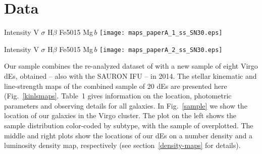 \documentclass[useAMS,usenatbib]{mn2e}
\newcounter{subfigure}
\newcommand{\hb}{H$\beta$}
\newcommand{\sig}{$\sigma$}
\newcommand{\mgb}{Mg\,$b$}
\begin{document}
\section[Data]{Data}
\label{label:data}

\begin{figure*}
\begin{leftfullpage}
\begin{center}
\hspace{0.3cm}Intensity \hspace{1.5cm} V \hspace{1.9cm} {\sig} \hspace{1.9cm} {\hb} \hspace{1.9cm} Fe5015 \hspace{1.5cm} {\mgb}
\texttt{[image: maps\_paperA\_1\_ss\_SN30.eps]}
\end{center}
\caption{Intensity, stellar velocity, velocity dispersion, \hb, Fe5015, and {\mgb} lines maps. The maps shown here comprise the re-analyzed sample of \protect\cite{rys:2013} together with the new data presented here for the first time.}
\label{kinlsmaps}
\end{leftfullpage}
\end{figure*}

\addtocounter{figure}{-1}
\addtocounter{subfigure}{1}


\begin{figure*}
\begin{fullpage}
\begin{center}
\hspace{0.3cm}Intensity \hspace{1.5cm} V \hspace{1.9cm} {\sig} \hspace{1.9cm} {\hb} \hspace{1.9cm} Fe5015 \hspace{1.5cm} {\mgb}
  \texttt{[image: maps\_paperA\_2\_ss\_SN30.eps]}
\end{center}
\end{fullpage}
\caption{Continued.}
\end{figure*}


Our sample combines the re-analyzed dataset of \cite{rys:2013} with a new sample of eight Virgo dEs, obtained -- also with the SAURON IFU -- in 2014. The stellar kinematic and line-strength maps of the combined sample of 20 dEs are presented here (Fig.~\ref{kinlsmaps}. Table~1 gives information on the location, photometric parameters and observing details for all galaxies. In Fig.~\ref{sample} we show the location of our galaxies in the Virgo cluster. The plot on the left shows the sample distribution color-coded by subtype, with the sample of \cite{lisker:2006a} overplotted. The middle and right plots show the locations of our dEs on a number density and a luminosity density map, respectively (see section~\ref{density-maps} for details). 
\end{document}
